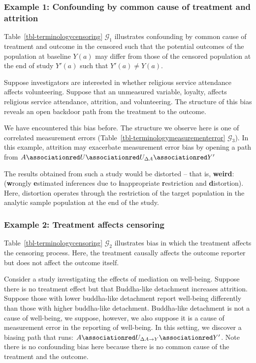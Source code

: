 \documentclass[
  single column]{article}
\begin{document}
\subsubsection{Example 1: Confounding by common cause of treatment and
attrition}\label{example-1-confounding-by-common-cause-of-treatment-and-attrition}

Table~\ref{tbl-terminologycensoring} \(\mathcal{G}_1\) illustrates
confounding by common cause of treatment and outcome in the censored
such that the potential outcomes of the population at baseline \(Y(a)\)
may differ from those of the censored population at the end of study
\(Y'(a)\) such that \(Y'(a) \neq Y(a)\).

Suppose investigators are interested in whether religious service
attendance affects volunteering. Suppose that an unmeasured variable,
loyalty, affects religious service attendance, attrition, and
volunteering. The structure of this bias reveals an open backdoor path
from the treatment to the outcome.

We have encountered this bias before. The structure we observe here is
one of correlated measurement errors
(Table~\ref{tbl-terminologymeasurementerror} \(\mathcal{G}_3\)). In this
example, attrition may exacerbate measurement error bias by opening a
path from
\(A \associationred U \associationred U_{\Delta{A}}  \associationred Y'\)

The results obtained from such a study would be distorted -- that is,
\textbf{weird}: (\textbf{w}rongly \textbf{e}stimated inferences due to
\textbf{i}nappropriate \textbf{r}estriction and \textbf{d}istortion).
Here, distortion operates through the restriction of the target
population in the analytic sample population at the end of the study.

\subsubsection{Example 2: Treatment affects
censoring}\label{example-2-treatment-affects-censoring}

Table~\ref{tbl-terminologycensoring} \(\mathcal{G}_2\) illustrates bias
in which the treatment affects the censoring process. Here, the
treatment causally affects the outcome reporter but does not affect the
outcome itself.

Consider a study investigating the effects of mediation on well-being.
Suppose there is no treatment effect but that Buddha-like detachment
increases attrition. Suppose those with lower buddha-like detachment
report well-being differently than those with higher buddha-like
detachment. Buddha-like detachment is not a cause of well-being, we
suppose, however, we also suppose it is a cause of measurement error in
the reporting of well-being. In this setting, we discover a biasing path
that runs: \(A \associationred U_{\Delta{A\to Y}}  \associationred Y'\).
Note there is no confounding bias here because there is no common cause
of the treatment and the outcome.
\end{document}
